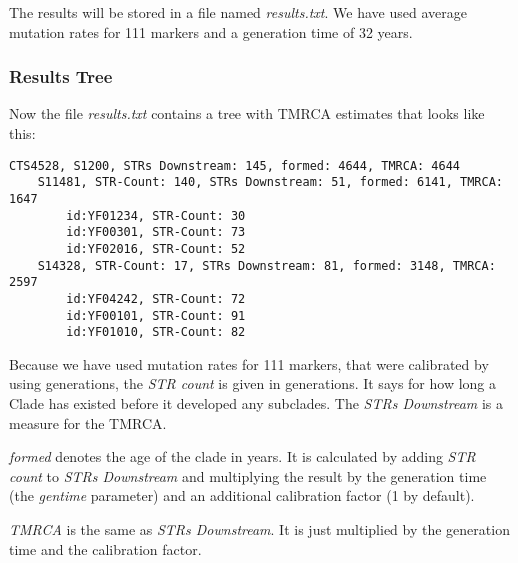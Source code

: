 The results will be stored in a file named \emph{results.txt}.
We have used average mutation rates for 111 markers and a
generation time of 32 years.


\subsubsection*{Results Tree}

Now the file \emph{results.txt} contains a tree with TMRCA
estimates that looks like this:

\begin{verbatim}
CTS4528, S1200, STRs Downstream: 145, formed: 4644, TMRCA: 4644
    S11481, STR-Count: 140, STRs Downstream: 51, formed: 6141, TMRCA: 1647
        id:YF01234, STR-Count: 30
        id:YF00301, STR-Count: 73
        id:YF02016, STR-Count: 52
    S14328, STR-Count: 17, STRs Downstream: 81, formed: 3148, TMRCA: 2597
        id:YF04242, STR-Count: 72
        id:YF00101, STR-Count: 91
        id:YF01010, STR-Count: 82
\end{verbatim}

Because we have used mutation rates for 111 markers, that
were calibrated by using generations, the \emph{STR count}
is given in generations. It says for how long a Clade has
existed before it developed any subclades. The
\emph{STRs Downstream} is a measure for the TMRCA.

\emph{formed} denotes the age of the clade in years. It is
calculated by adding \emph{STR count} to \emph{STRs Downstream}
and multiplying the result by the generation time (the
\emph{gentime} parameter) and an additional calibration
factor (1 by default).

\emph{TMRCA} is the same as \emph{STRs Downstream}. It is
just multiplied by the generation time and the calibration
factor.











